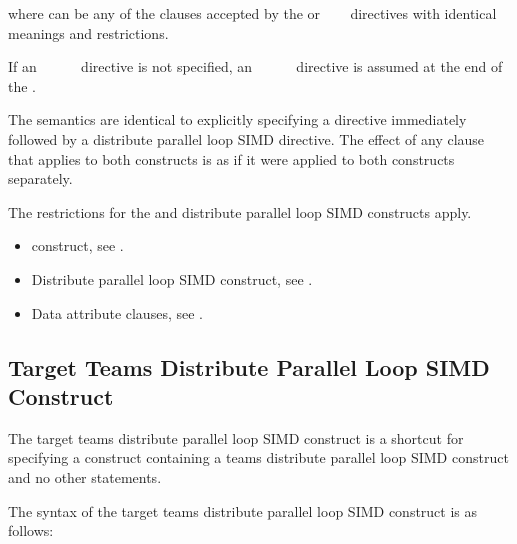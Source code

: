where  can be any of the clauses accepted by the  or 
~~~
directives with identical meanings and restrictions.

If an ~~~~~ directive is not specified, an 
~~~~~ directive is assumed at the end of 
the .
\fortranspecificend

\descr
The semantics are identical to explicitly specifying a  directive immediately 
followed by a distribute parallel loop SIMD directive. The effect of any clause that 
applies to both constructs is as if it were applied to both constructs separately.

\restrictions
The restrictions for the  and distribute parallel loop
SIMD constructs apply.

\crossreferences
\begin{itemize}
\item {} construct, see 
.

\item Distribute parallel loop SIMD construct, see 
.

\item Data attribute clauses, see 
.
\end{itemize}










\subsection{Target Teams Distribute Parallel Loop SIMD Construct}
\label{subsec:Target Teams Distribute Parallel Loop SIMD Construct}
\summary
The target teams distribute parallel loop SIMD construct is a shortcut for specifying a  
construct containing a teams distribute parallel loop SIMD construct and no other statements.

\syntax
\ccppspecificstart
The syntax of the target teams distribute parallel loop SIMD construct is as follows:

